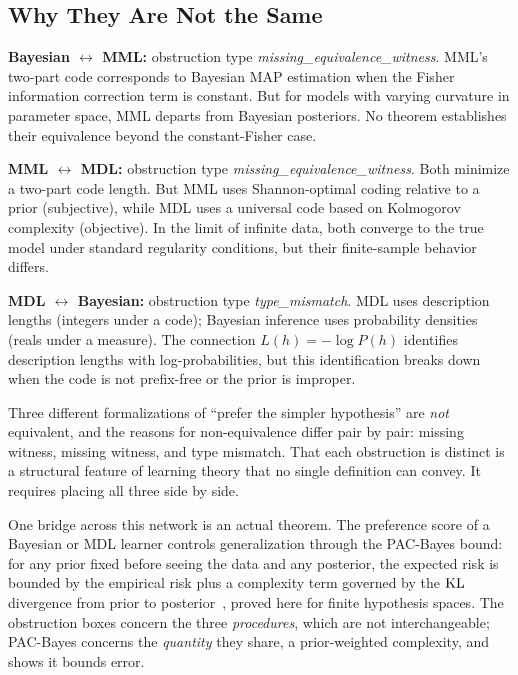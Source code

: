 \subsection{Why They Are Not the Same}

\begin{obstbox}
\textbf{Bayesian $\leftrightarrow$ MML:} obstruction type \emph{missing\_equivalence\_witness}. MML's two-part code corresponds to Bayesian MAP estimation when the Fisher information correction term is constant. But for models with varying curvature in parameter space, MML departs from Bayesian posteriors. No theorem establishes their equivalence beyond the constant-Fisher case.
\end{obstbox}

\begin{obstbox}
\textbf{MML $\leftrightarrow$ MDL:} obstruction type \emph{missing\_equivalence\_witness}. Both minimize a two-part code length. But MML uses Shannon-optimal coding relative to a prior (subjective), while MDL uses a universal code based on Kolmogorov complexity (objective). In the limit of infinite data, both converge to the true model under standard regularity conditions, but their finite-sample behavior differs.
\end{obstbox}

\begin{obstbox}
\textbf{MDL $\leftrightarrow$ Bayesian:} obstruction type \emph{type\_mismatch}. MDL uses description lengths (integers under a code); Bayesian inference uses probability densities (reals under a measure). The connection $L(h) = -\log P(h)$ identifies description lengths with log-probabilities, but this identification breaks down when the code is not prefix-free or the prior is improper.
\end{obstbox}

Three different formalizations of ``prefer the simpler hypothesis'' are \emph{not} equivalent, and the reasons for non-equivalence differ pair by pair: missing witness, missing witness, and type mismatch. That each obstruction is distinct is a structural feature of learning theory that no single definition can convey. It requires placing all three side by side.

One bridge across this network is an actual theorem. The preference score of a Bayesian or MDL learner controls generalization through the PAC-Bayes bound: for any prior fixed before seeing the data and any posterior, the expected risk is bounded by the empirical risk plus a complexity term governed by the $\mathrm{KL}$ divergence from prior to posterior~\cite{McAllester1999}, proved here for finite hypothesis spaces. The obstruction boxes concern the three \emph{procedures}, which are not interchangeable; PAC-Bayes concerns the \emph{quantity} they share, a prior-weighted complexity, and shows it bounds error.

